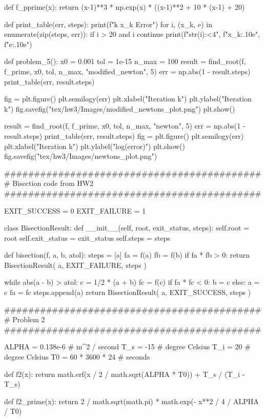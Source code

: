 \documentclass{homework}
\begin{document}
\begin{python}
def f_pprime(x):
    return (x-1)**3 * np.exp(x) * ((x-1)**2 + 10 * (x-1) + 20)


def print_table(err, steps):
    print(f"k    x_k               Error")
    for i, (x_k, e) in enumerate(zip(steps, err)):
        if i > 20 and i %
            continue
        print(f"{str(i):<4}", f"{x_k:.10e}", f"{e:.10e}")

def problem_5():
    x0 = 0.001
    tol = 1e-15
    n_max = 100
    result = find_root(f, f_prime, x0, tol, n_max, "modified_newton", 5)
    err = np.abs(1 - result.steps)
    print_table(err, result.steps)

    fig = plt.figure()
    plt.semilogy(err)
    plt.xlabel("Iteration k")
    plt.ylabel("Iteration k")
    fig.savefig("tex/hw3/Images/modified_newtons_plot.png")
    plt.show()

    result = find_root(f, f_prime, x0, tol, n_max, "newton", 5)
    err = np.abs(1 - result.steps)
    print_table(err, result.steps)
    fig = plt.figure()
    plt.semilogy(err)
    plt.xlabel("Iteration k")
    plt.ylabel("log(error)")
    plt.show()
    fig.savefig("tex/hw3/Images/newtons_plot.png")

###########################################
# Bisection code from HW2
###########################################


EXIT_SUCCESS = 0
EXIT_FAILURE = 1


class BisectionResult:
    def __init__(self, root, exit_status, steps):
        self.root = root
        self.exit_status = exit_status
        self.steps = steps


def bisection(f, a, b, atol):
    steps = [a]
    fa = f(a)
    fb = f(b)
    if fa * fb > 0:
        return BisectionResult(
            a, EXIT_FAILURE, steps
        )

    while abs(a - b) > atol:
        c = 1/2 * (a + b)
        fc = f(c)
        if fa * fc < 0:
            b = c
        else:
            a = c
            fa = fc
        steps.append(a)
    return BisectionResult(
        a, EXIT_SUCCESS, steps
    )

###########################################
# Problem 2
###########################################

ALPHA = 0.138e-6  # m^2 / second
T_s = -15  # degree Celsius
T_i = 20  # degree Celsius
T0 = 60 * 3600 * 24  # seconds


def f2(x):
    return math.erf(x / 2 / math.sqrt(ALPHA * T0)) + T_s / (T_i - T_s)

def f2_prime(x):
    return 2 / math.sqrt(math.pi) * math.exp(- x**2 / 4 / ALPHA / T0)



\end{python}
\end{document}
